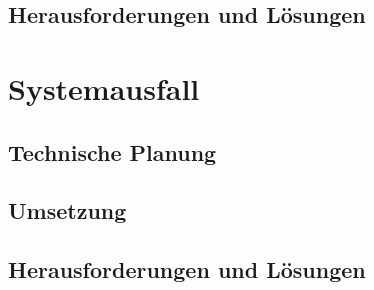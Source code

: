   \subsection{Herausforderungen und Lösungen}

\section{Systemausfall}

  \subsection{Technische Planung}

  \subsection{Umsetzung}

  \subsection{Herausforderungen und Lösungen}
